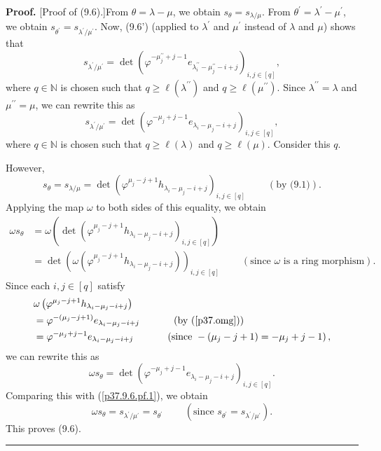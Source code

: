 \documentclass[numbers=enddot,12pt,final,onecolumn,notitlepage]{scrartcl}%
\theoremstyle{definition}
\newenvironment{proof}[1][Proof]{\noindent\textbf{#1.} }{\ \rule{0.5em}{0.5em}}
\begin{document}
\begin{enumerate}
\begin{proof}
[Proof of (9.6).]From $\theta=\lambda-\mu$, we obtain $s_{\theta}%
=s_{\lambda/\mu}$. From $\theta^{\prime}=\lambda^{\prime}-\mu^{\prime}$, we
obtain $s_{\theta^{\prime}}=s_{\lambda^{\prime}/\mu^{\prime}}$. Now, (9.6')
(applied to $\lambda^{\prime}$ and $\mu^{\prime}$ instead of $\lambda$ and
$\mu$) shows that%
\[
s_{\lambda^{\prime}/\mu^{\prime}}=\det\left(  \varphi^{-\mu_{j}^{\prime\prime
}+j-1}e_{\lambda_{i}^{\prime\prime}-\mu_{j}^{\prime\prime}-i+j}\right)
_{i,j\in\left[  q\right]  },
\]
where $q\in\mathbb{N}$ is chosen such that $q\geq\ell\left(  \lambda
^{\prime\prime}\right)  $ and $q\geq\ell\left(  \mu^{\prime\prime}\right)  $.
Since $\lambda^{\prime\prime}=\lambda$ and $\mu^{\prime\prime}=\mu$, we can
rewrite this as%
\begin{equation}
s_{\lambda^{\prime}/\mu^{\prime}}=\det\left(  \varphi^{-\mu_{j}+j-1}%
e_{\lambda_{i}-\mu_{j}-i+j}\right)  _{i,j\in\left[  q\right]  }%
,\label{p37.9.6.pf.1}%
\end{equation}
where $q\in\mathbb{N}$ is chosen such that $q\geq\ell\left(  \lambda\right)  $
and $q\geq\ell\left(  \mu\right)  $. Consider this $q$.

However,%
\[
s_{\theta}=s_{\lambda/\mu}=\det\left(  \varphi^{\mu_{j}-j+1}h_{\lambda_{i}%
-\mu_{j}-i+j}\right)  _{i,j\in\left[  q\right]  }\ \ \ \ \ \ \ \ \ \ \left(
\text{by (9.1)}\right)  .
\]
Applying the map $\omega$ to both sides of this equality, we obtain%
\begin{align*}
\omega s_{\theta}  &  =\omega\left(  \det\left(  \varphi^{\mu_{j}%
-j+1}h_{\lambda_{i}-\mu_{j}-i+j}\right)  _{i,j\in\left[  q\right]  }\right) \\
&  =\det\left(  \omega\left(  \varphi^{\mu_{j}-j+1}h_{\lambda_{i}-\mu_{j}%
-i+j}\right)  \right)  _{i,j\in\left[  q\right]  }\ \ \ \ \ \ \ \ \ \ \left(
\text{since }\omega\text{ is a ring morphism}\right)  .
\end{align*}
Since each $i,j\in\left[  q\right]  $ satisfy%
\begin{align*}
&  \omega\left(  \varphi^{\mu_{j}-j+1}h_{\lambda_{i}-\mu_{j}-i+j}\right) \\
&  =\varphi^{-\left(  \mu_{j}-j+1\right)  }e_{\lambda_{i}-\mu_{j}%
-i+j}\ \ \ \ \ \ \ \ \ \ \left(  \text{by (\ref{p37.omg})}\right) \\
&  =\varphi^{-\mu_{j}+j-1}e_{\lambda_{i}-\mu_{j}-i+j}%
\ \ \ \ \ \ \ \ \ \ \left(  \text{since }-\left(  \mu_{j}-j+1\right)
=-\mu_{j}+j-1\right)  ,
\end{align*}
we can rewrite this as%
\[
\omega s_{\theta}=\det\left(  \varphi^{-\mu_{j}+j-1}e_{\lambda_{i}-\mu
_{j}-i+j}\right)  _{i,j\in\left[  q\right]  }.
\]
Comparing this with (\ref{p37.9.6.pf.1}), we obtain%
\[
\omega s_{\theta}=s_{\lambda^{\prime}/\mu^{\prime}}=s_{\theta^{\prime}%
}\ \ \ \ \ \ \ \ \ \ \left(  \text{since }s_{\theta^{\prime}}=s_{\lambda
^{\prime}/\mu^{\prime}}\right)  .
\]
This proves (9.6).
\end{proof}


\end{enumerate}
\end{document}
